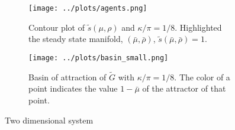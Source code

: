 \documentclass[../../main.tex]{subfiles}
\begin{document}
\begin{figure}[H]
  \centering
  \begin{subfigure}{.5\textwidth}
    \centering
    \texttt{[image: ../plots/agents.png]}
    \caption{Contour plot of $\tilde{s}(\mu, \rho)$ and $\kappa / \pi = 1 / 8$. Highlighted the steady state manifold, $(\bar{\mu}, \bar{\rho})$, $\tilde{s}(\bar{\mu}, \bar{\rho}) = 1$.}
    \label{fig:two-dimensional:agent-optimum}
  \end{subfigure}%
  \begin{subfigure}{.5\textwidth}
    \centering
    \texttt{[image: ../plots/basin\_small.png]}
    \caption{Basin of attraction of $\tilde{G}$ with $\kappa / \pi = 1 / 8$. The color of a point indicates the value $1 - \bar{\mu}$ of the attractor of that point.}
    \label{fig:two-dimensional:basin}
  \end{subfigure}%
  \caption{Two dimensional system}
  \label{fig:two-dimensional}
\end{figure}
\end{document}
